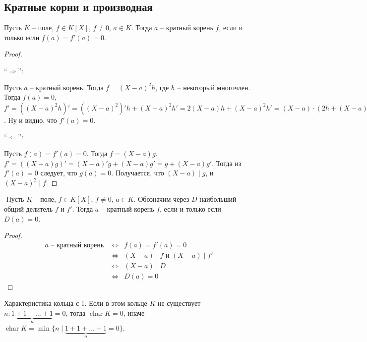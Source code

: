 
\begin{normalsize}
\section{Кратные корни и производная}

\begin{theorem-non}
    Пусть $K$ -- поле, $f \in K[X]$, $f \neq 0$, $a \in K$.
    Тогда $a$ -- кратный корень $f$, если и только если 
    $f(a) = f'(a) = 0$.
\end{theorem-non}
\begin{proof} $ $

    ``$\Longrightarrow$'':

    Пусть $a$ -- кратный корень. Тогда $f = (X - a)^2 h$, где $h$ --
    некоторый многочлен. Тогда $f(a) = 0$, $f' = ((X - a)^2 h)' =
    ((X - a)^2)' h + (X - a)^2 h' = 2(X - a) h + (X - a)^2 h' = 
    (X - a) \cdot (2h + (X - a) h')$. Ну и видно, что $f'(a) = 0$.

    ``$\Longleftarrow$'':

    Пусть $f(a) = f'(a) = 0$. Тогда $f = (X - a)g$. $f' = ((X - a)g)' =
    (X - a)'g + (X - a)g' = g + (X - a)g'$. Тогда из $f'(a) = 0$
    следует, что $g(a) = 0$. Получается, что $(X - a) \mid g$, и
    $(X - a)^2 \mid f$. 
\end{proof}

\follow$ $
    Пусть $K$ -- поле, $f \in K[X]$, $f \neq 0$, $a \in K$. Обозначим
    через $D$ наибольший общий делитель $f$ и $f'$. Тогда $a$ --
    кратный корень $f$, если и только если $D(a) = 0$.

\begin{proof}
    \begin{eqnarray*}
        a \text{ -- кратный корень } &\Longleftrightarrow&
        f(a) = f'(a) = 0 \\
        &\Longleftrightarrow& (X - a) \mid f \text{ и } (X - a) \mid f' \\
        &\Longleftrightarrow& (X - a) \mid D \\
        &\Longleftrightarrow& D(a) = 0
    \end{eqnarray*}
\end{proof}

\begin{conj}
    Характеристика кольца с 1.
    Если в этом кольце $K$ не существует $n : \underbrace{1 + 1 + 
    \dots + 1}_n = 0$, тогда $\operatorname{char} K = 0$, иначе 
    $\operatorname{char} K = \min \{n \mid \underbrace{1 + 1 + \dots + 1
    }_n = 0\}$.
\end{conj}


\end{normalsize}
